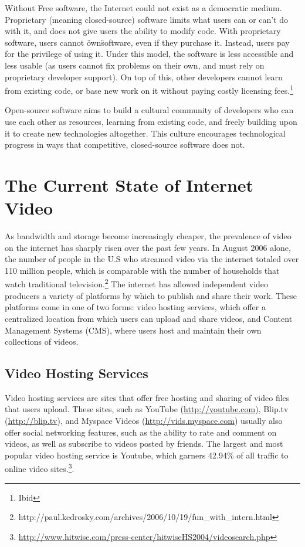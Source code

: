 \documentclass[a4paper,12pt]{report}
\begin{document}
Without Free software, the Internet could not exist as a democratic medium.
Proprietary (meaning closed-source) software limits what users can or can't do with it, and does not give users the ability to modify code.
With proprietary software, users cannot \"own\" software, even if they purchase it.
Instead, users pay for the privilege of using it.
Under this model, the software is less accessible and less usable (as users cannot fix problems on their own, and must rely on proprietary developer support).
On top of this, other developers cannot learn from existing code, or base new work on it without paying costly licensing fees.\footnote{Ibid} 


Open-source software aims to build a cultural community of developers who can use each other as resources, learning from existing code, and freely building upon it to create new technologies altogether.
This culture encourages technological progress in ways that competitive, closed-source software does not. 

\section{The Current State of Internet Video}
As bandwidth and storage become increasingly cheaper, the prevalence of video on the internet has sharply risen over the past few years. 
In August 2006 alone, the number of people in the U.S who streamed video 
via the internet totaled over 110 million people, which is comparable 
with the number of households that watch traditional television.\footnote{http://paul.kedrosky.com/archives/2006/10/19/fun\_with\_intern.html}
The internet has allowed independent video producers a variety of platforms by which to publish and share their work. These platforms come in one of two forms: video hosting services, which offer a centralized location from which users can upload and share videos, and Content Management Systems (CMS), where users host and maintain their own collections of videos.

\subsection{Video Hosting Services}
Video hosting services are sites that offer free hosting and sharing of video files that users upload.
These sites, such as YouTube (\url{http://youtube.com}), Blip.tv (\url{http://blip.tv}), and Myspace Videos (\url{http://vids.myspace.com}) usually also offer social networking features, such as the ability to rate and comment on videos, as well as subscribe to videos posted by friends.
The largest and most popular video hosting service is Youtube, which garners 42.94\% of all traffic to online video sites.\footnote{\url{http://www.hitwise.com/press-center/hitwiseHS2004/videosearch.php}}. 
\end{document}
